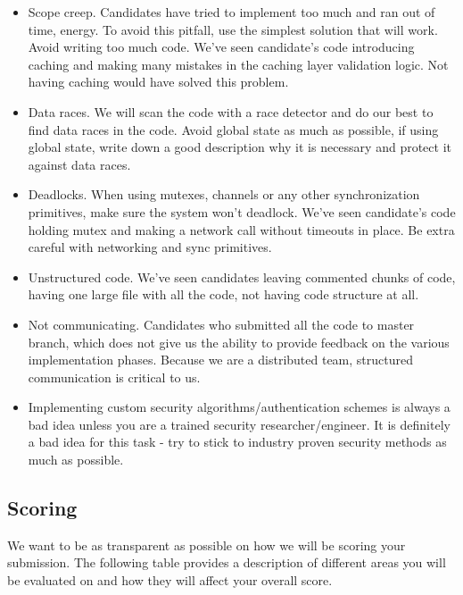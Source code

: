 \documentclass{article}
\begin{document}
    \begin{itemize}
    \item Scope creep. Candidates have tried to implement too much and ran out of time, energy. To avoid this pitfall, use the simplest solution that will work. Avoid writing too much code. We've seen candidate's code introducing caching and making many mistakes in the caching layer validation logic. Not having caching would have solved this problem.
    \item Data races. We will scan the code with a race detector and do our best to find data races in the code. Avoid global state as much as possible, if using global state, write down a good description why it is necessary and protect it against data races.
    \item Deadlocks. When using mutexes, channels or any other synchronization primitives, make sure the system won't deadlock. We've seen candidate's code holding mutex and making a network call without timeouts in place. Be extra careful with networking and sync primitives.
    \item Unstructured code. We've seen candidates leaving commented chunks of code, having one large file with all the code, not having code structure at all.
    \item Not communicating. Candidates who submitted all the code to master branch, which does not give us the ability to provide feedback on the various implementation phases. Because we are a distributed team, structured communication is critical to us.
    \item Implementing custom security algorithms/authentication schemes is always a bad idea unless you are a trained security researcher/engineer. It is definitely a bad idea for this task - try to stick to industry proven security methods as much as possible.
    \end{itemize}

\subsection{Scoring}
    
We want to be as transparent as possible on how we will be scoring your submission.
The following table provides a description of different areas you will be evaluated on and how they will affect your overall score.
\end{document}
